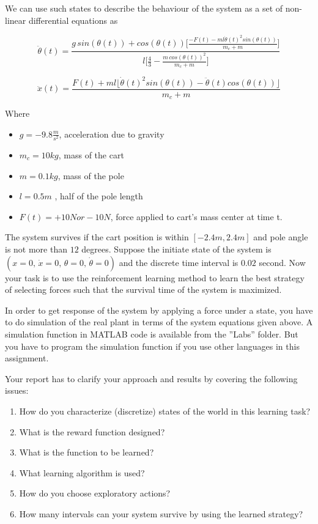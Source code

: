\documentclass[12pt,a4paper]{article}
\makeatletter
\newcommand\mynobreakpar{\par\nobreak\@afterheading}
\makeatother
\begin{document}
\noindent
We can use such states to describe the behaviour of the system as a set of non-linear
differential equations as

$$
\ddot{\theta}(t) = \frac{ g\,sin(\theta(t)) + cos(\theta(t))\Big[\frac{-F(t)-ml\dot{\theta}(t)^2sin(\theta(t))}{m_c + m}\Big]}
                        {l\Big[\frac{4}{3} - \frac{m\,cos(\theta(t))^2}{m_c + m}\Big]}
$$

$$
\ddot{x}(t) = \frac{F(t) + ml \lfloor \dot\theta(t)^2 sin(\theta(t)) - \ddot{\theta}(t) cos(\theta(t))\rfloor}
                   {m_c + m}
$$

\noindent
Where\mynobreakpar
\begin{itemize}

	\item[] $g = -9.8 \frac{m}{s^2}$, acceleration due to gravity
	\item[] $m_c = 10 kg$, mass of the cart
	\item[] $m = 0.1 kg$, mass of the pole
	\item[] $l = 0.5 m$ , half of the pole length
	\item[] $F(t) = +10 N or -10 N$, force applied to cart’s mass center at time t.

\end{itemize}

The system survives if the cart position is within $[-2.4 m, 2.4 m]$ and pole angle is not more
than $12$ degrees. Suppose the initiate state of the system is $(x=0,\, \dot x=0,\, \theta=0,\, \dot \theta=0)$ and the 
discrete time interval is $0.02$ second. Now your task is to use the reinforcement learning
method to learn the best strategy of selecting forces such that the survival time of the system
is maximized.


In order to get response of the system by applying a force under a state, you have to do
simulation of the real plant in terms of the system equations given above. A simulation
function in MATLAB code is available from the ''Labs'' folder. But you have to program the
simulation function if you use other languages in this assignment.


Your report has to clarify your approach and results by covering the following issues:

\begin{enumerate}

	\item How do you characterize (discretize) states of the world in this learning task?
	\item What is the reward function designed?
	\item What is the function to be learned?
	\item What learning algorithm is used?
	\item How do you choose exploratory actions?
	\item How many intervals can your system survive by using the learned strategy?

\end{enumerate}
\end{document}
